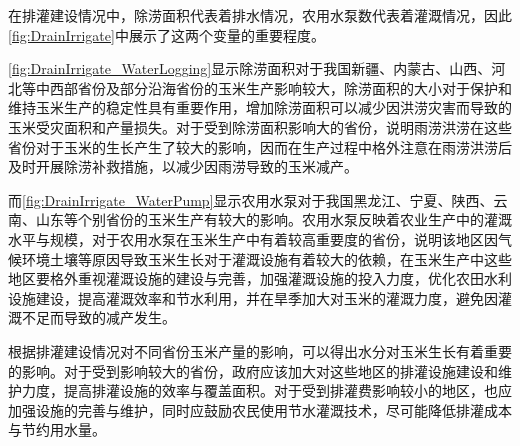   在排灌建设情况中，除涝面积代表着排水情况，农用水泵数代表着灌溉情况，因此\ref{fig:DrainIrrigate}中展示了这两个变量的重要程度。

  \ref{fig:DrainIrrigate_WaterLogging}显示除涝面积对于我国新疆、内蒙古、山西、河北等中西部省份及部分沿海省份的玉米生产影响较大，除涝面积的大小对于保护和维持玉米生产的稳定性具有重要作用，增加除涝面积可以减少因洪涝灾害而导致的玉米受灾面积和产量损失。对于受到除涝面积影响大的省份，说明雨涝洪涝在这些省份对于玉米的生长产生了较大的影响，因而在生产过程中格外注意在雨涝洪涝后及时开展除涝补救措施，以减少因雨涝导致的玉米减产\cite{东北三省地区生长季旱涝对春玉米产量的影响}。
  
  而\ref{fig:DrainIrrigate_WaterPump}显示农用水泵对于我国黑龙江、宁夏、陕西、云南、山东等个别省份的玉米生产有较大的影响。农用水泵反映着农业生产中的灌溉水平与规模，对于农用水泵在玉米生产中有着较高重要度的省份，说明该地区因气候环境土壤等原因导致玉米生长对于灌溉设施有着较大的依赖，在玉米生产中这些地区要格外重视灌溉设施的建设与完善，加强灌溉设施的投入力度，优化农田水利设施建设，提高灌溉效率和节水利用，并在旱季加大对玉米的灌溉力度，避免因灌溉不足而导致的减产发生。

  根据排灌建设情况对不同省份玉米产量的影响，可以得出水分对玉米生长有着重要的影响。对于受到影响较大的省份，政府应该加大对这些地区的排灌设施建设和维护力度，提高排灌设施的效率与覆盖面积。对于受到排灌费影响较小的地区，也应加强设施的完善与维护，同时应鼓励农民使用节水灌溉技术，尽可能降低排灌成本与节约用水量。

